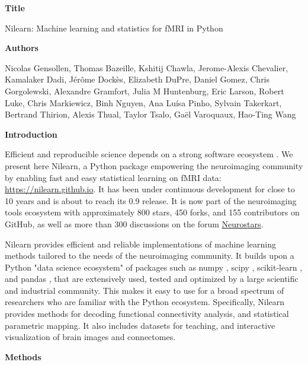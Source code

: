 \documentclass[a4paper]{article}
\begin{document}
\noindent \textbf{Title}

\medskip

\noindent Nilearn: Machine learning and statistics for fMRI in Python

\bigskip

\noindent \textbf{Authors}

\medskip

\noindent Nicolas Gensollen,  Thomas Bazeille, Kshitij Chawla, Jerome-Alexis Chevalier, Kamalaker Dadi, Jérôme Dockès, Elizabeth DuPre, Daniel Gomez, Chris Gorgolewski, Alexandre Gramfort, Julia M Huntenburg, Eric Larson, Robert Luke, Chris Markiewicz, Binh Nguyen, Ana Luísa Pinho, Sylvain Takerkart, Bertrand Thirion, Alexis Thual, Taylor Tsalo, Gaël Varoquaux, Hao-Ting Wang

\bigskip

\noindent \textbf{Introduction}

\medskip

\noindent Efficient and reproducible science depends on a strong software ecosystem \cite{Poldrack2019}. We present here Nilearn, a Python package empowering the neuroimaging community by enabling fast and easy statistical learning on fMRI data: \url{https://nilearn.github.io}. It has been under continuous development for close to 10 years and is about to reach its 0.9 release. It is now part of the neuroimaging tools ecosystem with approximately 800 stars, 450 forks, and 155 contributors on GitHub, as well as more than 300 discussions on the forum \href{https://neurostars.org/}{Neurostars}.

\medskip

\noindent Nilearn provides efficient and reliable implementations of machine learning methods tailored to the needs of the neuroimaging community. It builds upon a Python "data science ecosystem" of packages such as numpy \cite{VanDerWalt2011}, scipy \cite{Oliphant2007}, scikit-learn \cite{Pedregosa2011}, and pandas \cite{McKinney2010}, that are extensively used, tested and optimized by a large scientific and industrial community. This makes it easy to use for a broad spectrum of researchers who are familiar with the Python ecosystem. Specifically, Nilearn provides methods  for decoding functional connectivity analysis, and statistical parametric mapping. It also includes datasets for teaching, and interactive visualization of brain images and connectomes.

\bigskip

\noindent \textbf{Methods}
\end{document}
